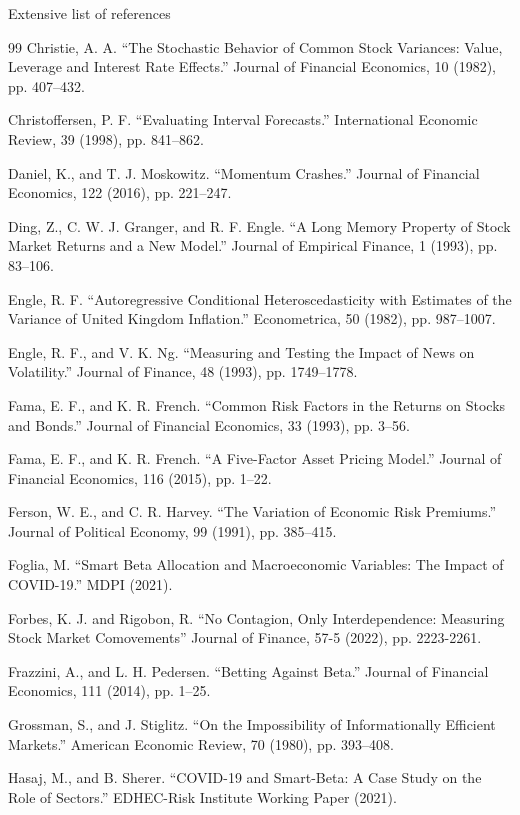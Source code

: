 \documentclass[aspectratio=169,10pt]{beamer}
\begin{document}
\begin{frame}{Extensive list of references}
\begin{thebibliography}{99}
 Christie, A. A. “The Stochastic Behavior of Common Stock Variances: Value, Leverage and Interest Rate Effects.” Journal of Financial Economics, 10 (1982), pp. 407–432.

 Christoffersen, P. F. “Evaluating Interval Forecasts.” International Economic Review, 39 (1998), pp. 841–862.

 Daniel, K., and T. J. Moskowitz. “Momentum Crashes.” Journal of Financial Economics, 122 (2016), pp. 221–247.

 Ding, Z., C. W. J. Granger, and R. F. Engle. “A Long Memory Property of Stock Market Returns and a New Model.” Journal of Empirical Finance, 1 (1993), pp. 83–106.

 Engle, R. F. “Autoregressive Conditional Heteroscedasticity with Estimates of the Variance of United Kingdom Inflation.” Econometrica, 50 (1982), pp. 987–1007.

 Engle, R. F., and V. K. Ng. “Measuring and Testing the Impact of News on Volatility.” Journal of Finance, 48 (1993), pp. 1749–1778.

 Fama, E. F., and K. R. French. “Common Risk Factors in the Returns on Stocks and Bonds.” Journal of Financial Economics, 33 (1993), pp. 3–56.

 Fama, E. F., and K. R. French. “A Five-Factor Asset Pricing Model.” Journal of Financial Economics, 116 (2015), pp. 1–22.

 Ferson, W. E., and C. R. Harvey. “The Variation of Economic Risk Premiums.” Journal of Political Economy, 99 (1991), pp. 385–415.

 Foglia, M. “Smart Beta Allocation and Macroeconomic Variables: The Impact of COVID-19.” MDPI (2021).

 Forbes, K. J. and Rigobon, R. “No Contagion, Only Interdependence: Measuring Stock Market Comovements” Journal of Finance, 57-5 (2022), pp. 2223-2261.

 Frazzini, A., and L. H. Pedersen. “Betting Against Beta.” Journal of Financial Economics, 111 (2014), pp. 1–25.

 Grossman, S., and J. Stiglitz. “On the Impossibility of Informationally Efficient Markets.” American Economic Review, 70 (1980), pp. 393–408.

 Hasaj, M., and B. Sherer. “COVID-19 and Smart-Beta: A Case Study on the Role of Sectors.” EDHEC-Risk Institute Working Paper (2021).


\end{thebibliography}
\end{frame}
\end{document}
